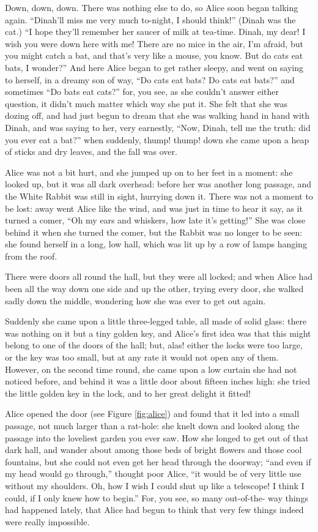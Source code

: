 \documentclass{l3proj}
\begin{document}
Down, down, down. There was nothing else to do, so Alice soon began talking
again. ``Dinah'll miss me very much to-night, I should think!'' (Dinah was
the cat.) ``I hope they'll remember her saucer of milk at tea-time. Dinah,
my dear! I wish you were down here with me! There are no mice in the air,
I'm afraid, but you might catch a bat, and that's very like a mouse, you
know. But do cats eat bats, I wonder?'' And here Alice began to get rather
sleepy, and went on saying to herself, in a dreamy son of way, ``Do cats eat
bats? Do cats eat bats?'' and sometimes ``Do bats eat cats?'' for, you see, as
she couldn't answer either question, it didn't much matter which way she
put it. She felt that she was dozing off, and had just begun to dream that
she was walking hand in hand with Dinah, and was saying to her, very
earnestly, ``Now, Dinah, tell me the truth: did you ever eat a bat?'' when
suddenly, thump! thump! down she came upon a heap of sticks and dry leaves,
and the fall was over.

Alice was not a bit hurt, and she jumped up on to her feet in a moment: she
looked up, but it was all dark overhead: before her was another long
passage, and the White Rabbit was still in sight, hurrying down it. There
was not a moment to be lost: away went Alice like the wind, and was just in
time to hear it say, as it turned a comer, ``Oh my ears and whiskers, how
late it's getting!'' She was close behind it when she turned the comer, but
the Rabbit was no longer to be seen: she found herself in a long, low hall,
which was lit up by a row of lamps hanging from the roof.

There were doors all round the hall, but they were all locked; and when
Alice had been all the way down one side and up the other, trying every
door, she walked sadly down the middle, wondering how she was ever to get
out again.

Suddenly she came upon a little three-legged table, all made of solid
glass: there was nothing on it but a tiny golden key, and Alice's first
idea was that this might belong to one of the doors of the hall; but, alas!
either the locks were too large, or the key was too small, but at any rate
it would not open any of them. However, on the second time round, she came
upon a low curtain she had not noticed before, and behind it was a little
door about fifteen inches high: she tried the little golden key in the
lock, and to her great delight it fitted!



Alice opened the door (see Figure \ref{fig:alice}) and found that it
led into a small passage, not much larger than a rat-hole: she knelt
down and looked along the passage into the loveliest garden you ever
saw. How she longed to get out of that dark hall, and wander about
among those beds of bright flowers and those cool fountains, but she
could not even get her head through the doorway; ``and even if my head
would go through,'' thought poor Alice, ``it would be of very little
use without my shoulders. Oh, how I wish I could shut up like a
telescope! I think I could, if I only knew how to begin.'' For, you
see, so many out-of-the- way things had happened lately, that Alice
had begun to think that very few things indeed were really impossible.
\end{document}
